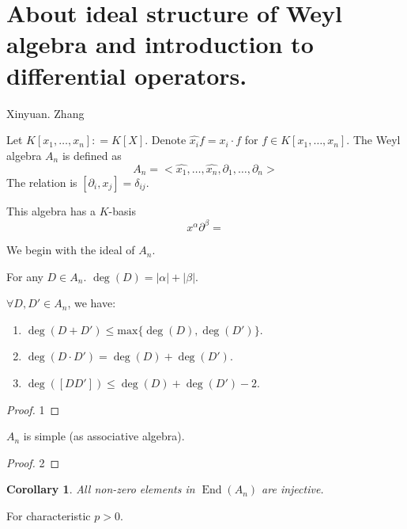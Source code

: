 \documentclass{article}
\newtheorem{corollary}[theorem]{Corollary}
\begin{document}

\section*{About ideal structure of Weyl algebra and introduction to differential operators.}

\begin{center}
Xinyuan. Zhang
\end{center}

Let $ K[x_1, \ldots , x_n]: = K[X] $. Denote $ \hat{x_i}f=x_i \cdot f $ for $ f \in K[x_1, \ldots , x_n] $. The Weyl algebra $ A_n $ is defined as
\[
A_n= < \hat{x_1}, \ldots, \hat{x_n}, \partial_1, \ldots, \partial_n  >
\]
The relation is $ [\partial_i, x_j] = \delta_{ij} $.

This algebra has a $ K $-basis 
\[
x^{\alpha} \partial^{\beta}=
\] 

We begin with the ideal of $ A_n $.

For any $ D \in A_n $. $ \deg (D)=|\alpha|+|\beta| $. 

\begin{theorem} 
$ \forall D,D' \in A_n $, we have:
\begin{enumerate}
    \item $ \deg(D+D') \le \mathrm{max}\{ \deg(D), \deg(D') \} $.
    \item $ \deg(D \cdot D') = \deg(D) + \deg(D') $.
    \item $ \deg ([DD']) \le \deg (D) + \deg (D')-2 $. 
\end{enumerate}
\end{theorem}

\begin{proof} 
1
\end{proof}

\begin{theorem} 
$A_n$ is simple (as associative algebra).
\end{theorem}

\begin{proof} 
2
\end{proof}


\begin{corollary}
All non-zero elements in $ \operatorname{End}(A_n)  $ are injective. 
\end{corollary}

For characteristic $ p > 0 $. 
\end{document}
